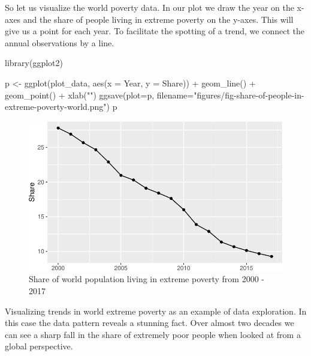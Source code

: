 \documentclass[
  letterpaper,
]{scrbook}
\newenvironment{Shaded}{\begin{snugshade}}{\end{snugshade}}
\newcommand{\AttributeTok}[1]{\textcolor[rgb]{0.40,0.45,0.13}{#1}}
\newcommand{\FunctionTok}[1]{\textcolor[rgb]{0.28,0.35,0.67}{#1}}
\newcommand{\NormalTok}[1]{\textcolor[rgb]{0.00,0.23,0.31}{#1}}
\newcommand{\OtherTok}[1]{\textcolor[rgb]{0.00,0.23,0.31}{#1}}
\newcommand{\SpecialCharTok}[1]{\textcolor[rgb]{0.37,0.37,0.37}{#1}}
\newcommand{\StringTok}[1]{\textcolor[rgb]{0.13,0.47,0.30}{#1}}
\begin{document}
So let us visualize the world poverty data. In our plot we draw the year
on the x-axes and the share of people living in extreme poverty on the
y-axes. This will give us a point for each year. To facilitate the
spotting of a trend, we connect the annual observations by a line.

\begin{Shaded}
\begin{Highlighting}[]
\FunctionTok{library}\NormalTok{(ggplot2)}

\NormalTok{p }\OtherTok{\textless{}{-}} \FunctionTok{ggplot}\NormalTok{(plot\_data, }\FunctionTok{aes}\NormalTok{(}\AttributeTok{x =}\NormalTok{ Year, }\AttributeTok{y =}\NormalTok{ Share)) }\SpecialCharTok{+} 
     \FunctionTok{geom\_line}\NormalTok{() }\SpecialCharTok{+}
     \FunctionTok{geom\_point}\NormalTok{() }\SpecialCharTok{+}
     \FunctionTok{xlab}\NormalTok{(}\StringTok{""}\NormalTok{)}
\FunctionTok{ggsave}\NormalTok{(}\AttributeTok{plot=}\NormalTok{p, }\AttributeTok{filename=}\StringTok{"figures/fig{-}share{-}of{-}people{-}in{-}extreme{-}poverty{-}world.png"}\NormalTok{)}
\NormalTok{p}
\end{Highlighting}
\end{Shaded}

\begin{figure}[H]

{\centering \includegraphics{./introduction_files/figure-pdf/fig-share-of-people-in-extreme-poverty-world-1.pdf}

}

\caption{\label{fig-share-of-people-in-extreme-poverty-world}Share of
world population living in extreme poverty from 2000 - 2017}

\end{figure}

Visualizing trends in world extreme poverty as an example of data
exploration. In this case the data pattern reveals a stunning fact. Over
almost two decades we can see a sharp fall in the share of extremely
poor people when looked at from a global perspective.
\end{document}
